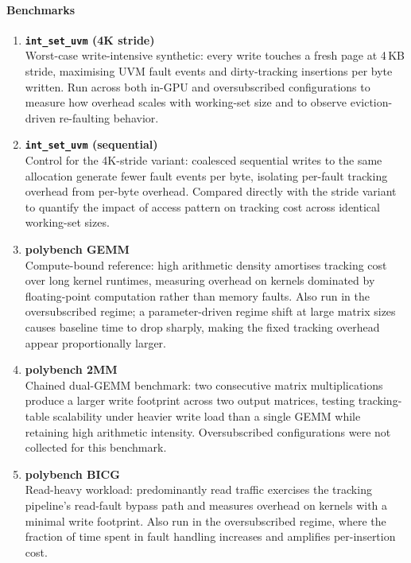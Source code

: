 \paragraph{Benchmarks}
\begin{enumerate}

    \item \textbf{\texttt{int\_set\_uvm} (4K stride)}
          \\Worst-case write-intensive synthetic: every write touches a fresh page at
          4\,KB stride, maximising UVM fault events and dirty-tracking insertions per
          byte written.
          Run across both in-GPU and oversubscribed configurations to measure how
          overhead scales with working-set size and to observe eviction-driven
          re-faulting behavior.

    \item \textbf{\texttt{int\_set\_uvm} (sequential)}
          \\Control for the 4K-stride variant: coalesced sequential writes to the same
          allocation generate fewer fault events per byte, isolating per-fault tracking
          overhead from per-byte overhead.
          Compared directly with the stride variant to quantify the impact of access
          pattern on tracking cost across identical working-set sizes.

    \item \textbf{polybench GEMM}
          \\Compute-bound reference: high arithmetic density amortises tracking cost
          over long kernel runtimes, measuring overhead on kernels dominated by
          floating-point computation rather than memory faults.
          Also run in the oversubscribed regime; a parameter-driven regime shift at
          large matrix sizes causes baseline time to drop sharply, making the fixed
          tracking overhead appear proportionally larger.

    \item \textbf{polybench 2MM}
          \\Chained dual-GEMM benchmark: two consecutive matrix multiplications produce
          a larger write footprint across two output matrices, testing tracking-table
          scalability under heavier write load than a single GEMM while retaining high
          arithmetic intensity.
          Oversubscribed configurations were not collected for this benchmark.

    \item \textbf{polybench BICG}
          \\Read-heavy workload: predominantly read traffic exercises the tracking
          pipeline's read-fault bypass path and measures overhead on kernels with a
          minimal write footprint.
          Also run in the oversubscribed regime, where the fraction of time spent in
          fault handling increases and amplifies per-insertion cost.


\end{enumerate}
